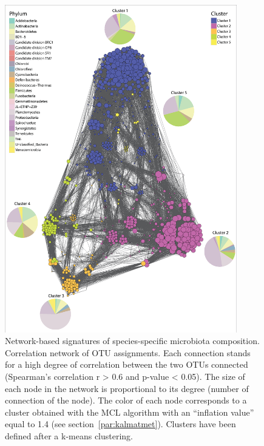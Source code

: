 \begin{figure}[!tb]
	\centering
	\includegraphics[width=0.9\textwidth]{./figures/Chapter_6/Figure_3_talkaled.eps}
  	\caption{Network-based signatures of species-specific microbiota composition. Correlation network of OTU assignments. Each connection stands for a high degree of correlation between the two OTUs connected (Spearman's correlation r {\textgreater} 0.6 and p-value {\textless} 0.05). The size of each node in the network is proportional to its degree (number of connection of the node). The color of each node corresponds to a cluster obtained with the MCL algorithm with an ``inflation value'' equal to 1.4 (see section~\ref{par:kalmatmet}). Clusters have been defined after a k-means clustering.\label{fig:3talkal}}
\end{figure}

